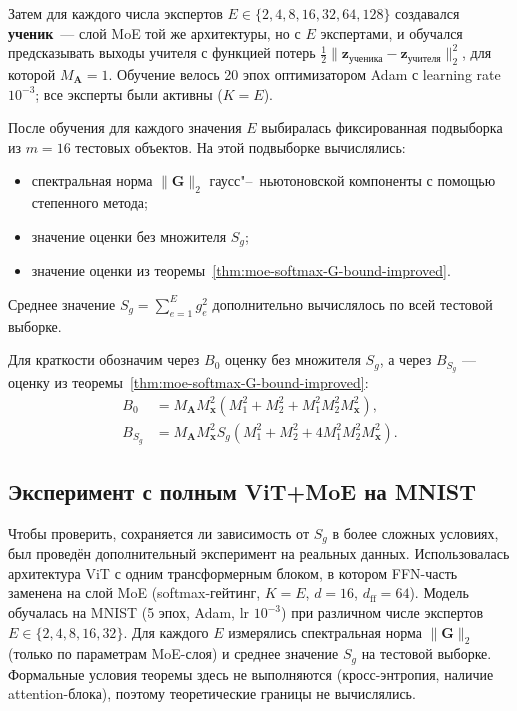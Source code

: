 \documentclass[11pt]{extarticle}
\theoremstyle{definition}
\theoremstyle{plain}
\theoremstyle{remark}
\begin{document}
Затем для каждого числа экспертов $E\in\{2,4,8,16,32,64,128\}$ создавался
\textbf{ученик}~--- слой MoE той же архитектуры, но с $E$ экспертами,
и обучался предсказывать выходы учителя с функцией потерь
$\frac12\|\mathbf{z}_{\text{ученика}} - \mathbf{z}_{\text{учителя}}\|_2^2$,
для которой $M_{\mathbf{A}}=1$.
Обучение велось 20 эпох оптимизатором Adam с learning rate $10^{-3}$;
все эксперты были активны ($K=E$).

После обучения для каждого значения $E$ выбиралась фиксированная подвыборка из $m=16$ тестовых объектов. На этой подвыборке вычислялись:
\begin{itemize}
    \item спектральная норма $\|\mathbf G\|_2$ гаусс"--~ньютоновской компоненты с помощью степенного метода;
    \item значение оценки без множителя $S_g$;
    \item значение оценки из теоремы~\ref{thm:moe-softmax-G-bound-improved}.
\end{itemize}
Среднее значение $S_g=\sum\limits_{e=1}^{E}g_e^2$ дополнительно вычислялось по всей тестовой выборке.

Для краткости обозначим через $B_0$ оценку без множителя $S_g$, а через $B_{S_g}$ --- оценку из теоремы~\ref{thm:moe-softmax-G-bound-improved}:
$$
\begin{aligned}
B_0
&=
M_{\mathbf A}M_{\mathbf x}^2
\left(
M_1^2+M_2^2+M_1^2M_2^2M_{\mathbf x}^2
\right), \\
B_{S_g}
&=
M_{\mathbf A}M_{\mathbf x}^2S_g
\left(
M_1^2+M_2^2+4M_1^2M_2^2M_{\mathbf x}^2
\right).
\end{aligned}
$$

\subsection{Эксперимент с полным ViT+MoE на MNIST}

Чтобы проверить, сохраняется ли зависимость от $S_g$ в более сложных условиях, был проведён дополнительный эксперимент на реальных данных. Использовалась архитектура ViT с одним трансформерным блоком, в котором FFN-часть заменена на слой MoE (softmax-гейтинг, $K{=}E$, $d{=}16$, $d_{\text{ff}}{=}64$). Модель обучалась на MNIST (5 эпох, Adam, lr $10^{-3}$) при различном числе экспертов $E\in\{2,4,8,16,32\}$. Для каждого $E$ измерялись спектральная норма $\|\mathbf G\|_2$ (только по параметрам MoE-слоя) и среднее значение $S_g$ на тестовой выборке. Формальные условия теоремы здесь не выполняются (кросс-энтропия, наличие attention-блока), поэтому теоретические границы не вычислялись.
\end{document}

